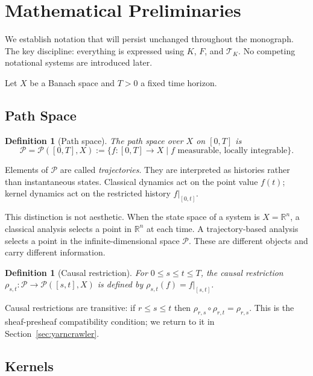 \documentclass[12pt]{article}
\newtheorem{definition}[theorem]{Definition}
\newcommand{\R}{\mathbb{R}}
\newcommand{\Pcal}{\mathcal{P}}
\newcommand{\TK}{\mathcal{T}_K}
\begin{document}
\section{Mathematical Preliminaries}
\label{sec:prelim}

We establish notation that will persist unchanged throughout the monograph.
The key discipline: everything is expressed using $K$, $F$, and $\TK$. No
competing notational systems are introduced later.

Let $X$ be a Banach space and $T > 0$ a fixed time horizon.

\subsection{Path Space}

\begin{definition}[Path space]
The \emph{path space} over $X$ on $[0,T]$ is
\[
  \Pcal = \Pcal([0,T], X)
  := \bigl\{f \colon [0,T] \to X \;\big|\;
  f\text{ measurable, locally integrable}\bigr\}.
\]
\end{definition}

Elements of $\Pcal$ are called \emph{trajectories}. They are interpreted as
histories rather than instantaneous states. Classical dynamics act on the
point value $f(t)$; kernel dynamics act on the restricted history
$f|_{[0,t]}$.

This distinction is not aesthetic. When the state space of a system is
$X = \R^n$, a classical analysis selects a point in $\R^n$ at each time.
A trajectory-based analysis selects a point in the infinite-dimensional
space $\Pcal$. These are different objects and carry different information.

\begin{definition}[Causal restriction]
For $0 \leq s \leq t \leq T$, the \emph{causal restriction}
$\rho_{s,t} \colon \Pcal \to \Pcal([s,t],X)$ is defined by
$\rho_{s,t}(f) = f|_{[s,t]}$.
\end{definition}

Causal restrictions are transitive: if $r \leq s \leq t$ then
$\rho_{r,s} \circ \rho_{r,t} = \rho_{r,s}$. This is the sheaf-presheaf
compatibility condition; we return to it in Section~\ref{sec:yarncrawler}.

\subsection{Kernels}
\end{document}
